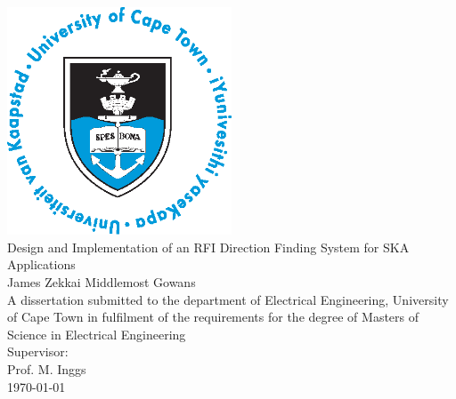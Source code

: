 \begin{titlepage}
\begin{center}

\includegraphics[width=0.5\textwidth]{./img/admin/uct-logo}\\[1.6cm]

{\LARGE Design and Implementation of an RFI Direction Finding System for SKA Applications}\\[1.6cm]
{\Large James Zekkai Middlemost Gowans}\\[1.6cm]

A dissertation submitted to the department of Electrical Engineering, University of Cape Town in fulfilment of the requirements for the degree of Masters of Science in Electrical Engineering\\[1.6cm]

Supervisor:\\
Prof. M. Inggs\\[1cm]

\today

\end{center}
\end{titlepage}

